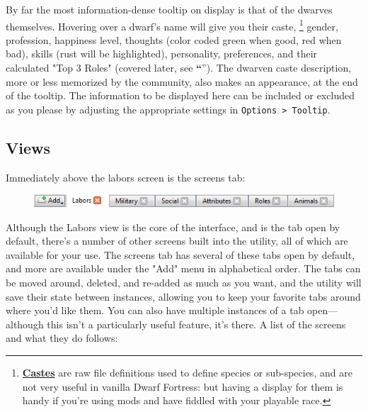 \documentclass[]{article}
\newcommand{\jump}[1] {\textbf{``\nameref{sec:#1}}''}
\begin{document}
By far the most information-dense tooltip on display is that of the dwarves themselves. Hovering over a
dwarf's name will give you their caste,
\footnote{\href{http://dwarffortresswiki.org/index.php/DF2012:Caste}{\textbf{Castes}} are raw file
definitions used to define species or sub-species, and are not very useful in vanilla Dwarf Fortress:
but having a display for them is handy if you're using mods and have fiddled with your playable race.}
gender, profession, happiness level, thoughts (color coded green when good, red when bad), skills (rust
will be highlighted), personality, preferences, and their calculated "Top 3 Roles" (covered later, see
\jump{Roles}). The dwarven caste description, more or less memorized by the community, also makes an
appearance, at the end of the tooltip. The information to be displayed here can be included or excluded
as you please by adjusting the appropriate settings in \texttt{Options > Tooltip}.

\newpage

\subsection{Views}
\label{sec:Screens Tab}
Immediately above the labors screen is the screens tab:

\begin{figure}[h!]
\centering
\includegraphics{Sec1Fig9}
\end{figure}

Although the Labors view is the core of the interface, and is the tab open by default, there's a number
of other screens built into the utility, all of which are available for your use. The screens tab has
several of these tabs open by default, and more are available under the "Add" menu in alphabetical order.
The tabs can be moved around, deleted, and re-added as much as you want, and the utility will save their
state between instances, allowing you to keep your favorite tabs around where you'd like them. You can
also have multiple instances of a tab open---although this isn't a particularly useful feature, it's
there. A list of the screens and what they do follows:
\end{document}
